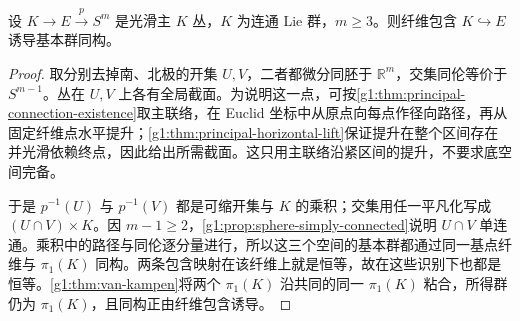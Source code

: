 \begin{lemma}\label{g1:lem:sphere-bundle-pi1}
	设 \(K\to E\xrightarrow{p}S^m\) 是光滑主 \(K\) 丛，\(K\) 为连通 Lie 群，\(m\ge3\)。则纤维包含 \(K\hookrightarrow E\) 诱导基本群同构。
\end{lemma}
\begin{proof}
	取分别去掉南、北极的开集 \(U,V\)，二者都微分同胚于 \(\mathbb R^m\)，交集同伦等价于 \(S^{m-1}\)。丛在 \(U,V\) 上各有全局截面。为说明这一点，可按\cref{g1:thm:principal-connection-existence}取主联络，在 Euclid 坐标中从原点向每点作径向路径，再从固定纤维点水平提升；\cref{g1:thm:principal-horizontal-lift}保证提升在整个区间存在并光滑依赖终点，因此给出所需截面。这只用主联络沿紧区间的提升，不要求底空间完备。

	于是 \(p^{-1}(U)\) 与 \(p^{-1}(V)\) 都是可缩开集与 \(K\) 的乘积；交集用任一平凡化写成 \((U\cap V)\times K\)。因 \(m-1\ge2\)，\cref{g1:prop:sphere-simply-connected}说明 \(U\cap V\) 单连通。乘积中的路径与同伦逐分量进行，所以这三个空间的基本群都通过同一基点纤维与 \(\pi_1(K)\) 同构。两条包含映射在该纤维上就是恒等，故在这些识别下也都是恒等。\cref{g1:thm:van-kampen}将两个 \(\pi_1(K)\) 沿共同的同一 \(\pi_1(K)\) 粘合，所得群仍为 \(\pi_1(K)\)，且同构正由纤维包含诱导。
\end{proof}

